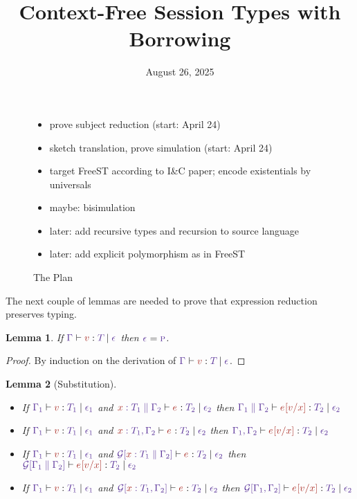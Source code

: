 \documentclass{article}
\title{Context-Free Session Types with Borrowing}
\date{August 26, 2025}
\newtheorem{lemma}{Lemma}
\begin{document}
\maketitle

\begin{figure}[tp]
  \begin{itemize}
  \item prove subject reduction (start: April 24)
  \item sketch translation, prove simulation (start: April 24)
  \item target FreeST according to I\&C paper; encode existentials by
    universals
  \item maybe: bisimulation
  \item later: add recursive types and recursion to source language
  \item later: add explicit polymorphism as in FreeST
  \end{itemize}
  \caption{The Plan}
  \label{fig:the-plan}
\end{figure}


The next couple of lemmas are needed to prove that
expression reduction preserves typing.

\begin{lemma}
  If $\HasType {\Ctx} {\V} {\T} {\Eff}$
  then $\Eff = \EffPure$.
\end{lemma}
\begin{proof}
  By induction on the derivation of $\HasType {\Ctx} {\V} {\T} {\Eff}$.
\end{proof}

\begin{lemma}[Substitution]\
  \begin{itemize}
    \item If $\HasType {\Ctx[1]} {\V} {\T[1]} {\Eff[1]}$ and
    $\HasType {\CtxExtUnord{\CtxVar x{\T[1]}}{\Ctx[2]}} {\E} {\T[2]} {\Eff[2]}$
    then 
    $\HasType {\CtxExtUnord{\Ctx[1]}{\Ctx[2]}} {\Subs\E\V x} {\T[2]} {\Eff[2]}$
    \item If $\HasType {\Ctx[1]} {\V} {\T[1]} {\Eff[1]}$ and
    $\HasType {\CtxExt{\CtxVar x{\T[1]}}{\Ctx[2]}} {\E} {\T[2]} {\Eff[2]}$
    then 
    $\HasType {\CtxExt{\Ctx[1]}{\Ctx[2]}} {\Subs\E\V x} {\T[2]} {\Eff[2]}$
    \item If $\HasType {\Ctx[1]} {\V} {\T[1]} {\Eff[1]}$
    and
    $\HasType
    {\CtxPattern{\CtxExtUnord{\CtxVar x{\T[1]}}{\Ctx[2]}}}
    {\E}
    {\T[2]}
    {\Eff[2]}$ then 
    $\HasType {\CtxPattern{\CtxExtUnord{\Ctx[1]}{\Ctx[2]}}} {\Subs\E\V x} {\T[2]} {\Eff[2]}$
  \item If $\HasType {\Ctx[1]} {\V} {\T[1]} {\Eff[1]}$
    and
    $\HasType
    {\CtxPattern{\CtxExt{\CtxVar x{\T[1]}}{\Ctx[2]}}}
    {\E}
    {\T[2]}
    {\Eff[2]}$ then 
    $\HasType {\CtxPattern{\CtxExt{\Ctx[1]}{\Ctx[2]}}} {\Subs\E\V x} {\T[2]} {\Eff[2]}$
  \end{itemize}
\end{lemma}
\end{document}
